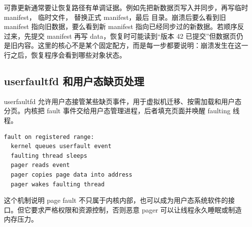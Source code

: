 可靠更新通常要让恢复路径有单调证据。例如先把新数据页写入并同步，再写临时 manifest， 临时文件， 替换正式 manifest，最后  目录。崩溃后要么看到旧 manifest 指向旧数据，要么看到新 manifest 指向已经同步过的新数据。若顺序反过来，先提交 manifest 再写 data，恢复时可能读到“版本 42 已提交”但数据页仍是旧内容。这里的核心不是某个固定配方，而是每一步都要说明：崩溃发生在这一行之后，恢复程序会看到哪些对象状态。

\subsection{userfaultfd 和用户态缺页处理}

userfaultfd 允许用户态接管某些缺页事件，用于虚拟机迁移、按需加载和用户态分页。内核把 fault 事件交给用户态管理进程，后者填充页面并唤醒 faulting 线程。

\begin{lstlisting}
fault on registered range:
  kernel queues userfault event
  faulting thread sleeps
  pager reads event
  pager copies page data into address
  pager wakes faulting thread
\end{lstlisting}

这个机制说明 page fault 不只属于内核内部，也可以成为用户态系统软件的接口。但它要求严格权限和资源控制，否则恶意 pager 可以让线程永久睡眠或制造内存压力。
